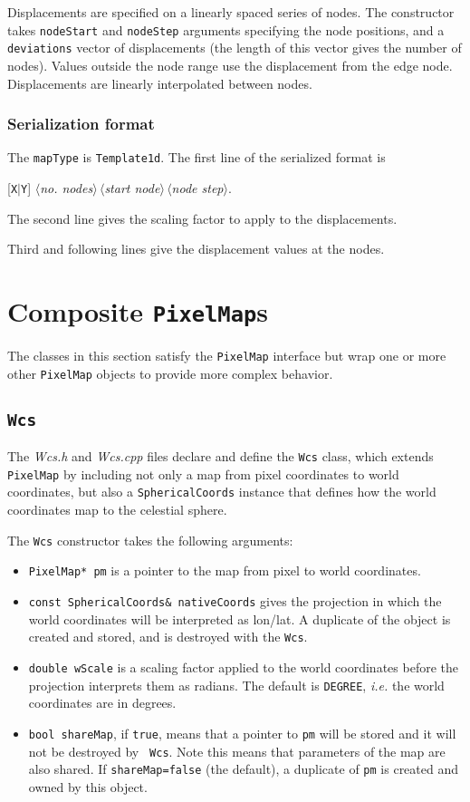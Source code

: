 \documentclass[11pt,preprint,flushrt]{aastex}
\begin{document}
Displacements are specified on a linearly spaced series of nodes.  The constructor takes {\tt nodeStart} and {\tt nodeStep} arguments specifying the node positions, and a {\tt deviations} vector of displacements (the length of this vector gives the number of nodes).  Values outside the node range use the displacement from the edge node.  Displacements are linearly interpolated between nodes.

\subsubsection{Serialization format}
The {\tt mapType} is {\tt Template1d}. 
The first line of the serialized format is

[{\tt X}$|${\tt Y}] {\it $\langle$no. nodes$\rangle\,\langle$start node$\rangle\,\langle$node step$\rangle$}.

The second line gives the scaling factor to apply to the displacements.

Third and following lines give the displacement values at the nodes.


\section{Composite {\tt PixelMap}s}
The classes in this section satisfy the {\tt PixelMap} interface but wrap one or more other {\tt PixelMap} objects to provide more complex behavior.

\subsection{\tt Wcs}
The {\it Wcs.h} and {\it Wcs.cpp} files declare and define the {\tt Wcs} class, which extends {\tt PixelMap} by including not only a map from pixel coordinates to world coordinates, but also a {\tt SphericalCoords} instance that defines how the world coordinates map to the celestial sphere.  

The {\tt Wcs} constructor takes the following arguments:
\begin{itemize}
\item {\tt PixelMap* pm} is a pointer to the map from pixel to world coordinates.
\item {\tt const SphericalCoords\& nativeCoords} gives the projection in which the world coordinates will be interpreted as lon/lat.  A duplicate of the object is created and stored, and is destroyed with the {\tt Wcs}.
\item {\tt double wScale} is a scaling factor applied to the world coordinates before the projection interprets them as radians.  The default is {\tt DEGREE}, {\it i.e.\/} the world coordinates are in degrees.
\item {\tt bool shareMap}, if {\tt true}, means that a pointer to {\tt pm} will be stored and it will not be destroyed by {\tt ~Wcs}.  Note this means that parameters of the map are also shared. If {\tt shareMap=false} (the default), a duplicate of {\tt pm} is created and owned by this object.
\end{itemize}
\end{document}
